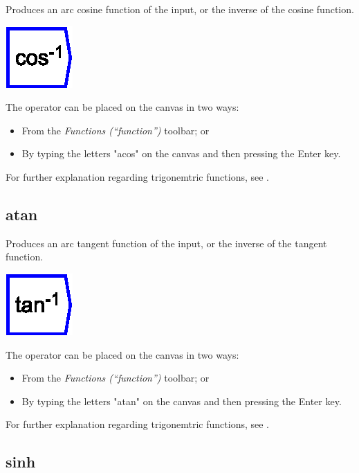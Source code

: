 \label{Operation:acos} Produces an arc cosine function of the input,
or the inverse of the cosine function.

\includegraphics{images/cos-1}

The operator can be placed on the canvas in two ways:
\begin{itemize}
\item From the \emph{Functions (``function'')} toolbar; or 
\item By typing the letters "acos" on the canvas and then pressing the
Enter key.
\end{itemize}
For further explanation regarding trigonemtric functions, see .

\subsection{atan}

\label{Operation:atan} Produces an arc tangent function of the input,
or the inverse of the tangent function.

\includegraphics{images/tan-1}

The operator can be placed on the canvas in two ways:
\begin{itemize}
\item From the \emph{Functions (``function'')} toolbar; or 
\item By typing the letters "atan" on the canvas and then pressing the
Enter key.
\end{itemize}
For further explanation regarding trigonemtric functions, see .

\subsection{sinh}

